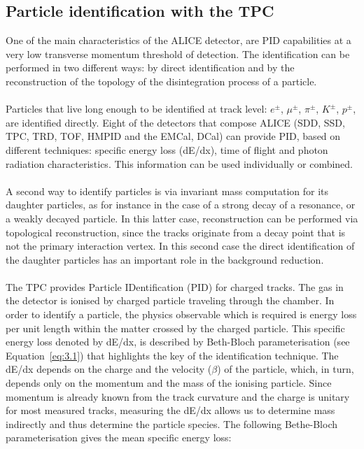 \subsection{Particle identification with the TPC }
\label{par:3.2f}
One of the main characteristics of the ALICE detector, are PID capabilities at a very low transverse momentum threshold of detection. The identification can be performed in two different ways: by direct identification and by the reconstruction of the topology of the disintegration process of a particle.\\
\\
Particles that live long enough to be identified at track level: $e^{\pm}$, $\mu^{\pm}$, $\pi^{\pm}$, $K^{\pm}$, $p^{\pm}$, are identified directly. Eight of the detectors that compose ALICE (SDD, SSD, TPC, TRD, TOF, HMPID and the EMCal, DCal) can provide PID, based on different techniques: specific energy loss (dE/dx), time of flight and photon radiation characteristics. This information can be used individually or combined.\\
\\
A second way to identify particles is via invariant mass computation for its daughter particles, as for instance in the case of a strong decay of a resonance, or a weakly decayed particle. In this latter case, reconstruction can be performed via topological reconstruction, since the tracks originate from a decay point that is not the primary interaction vertex. In this second case the direct identification of the daughter particles has an important role in the background reduction.\\
\\
The TPC provides Particle IDentification (PID) for charged tracks. The gas in the detector is ionised by charged particle traveling through the chamber. In order to identify a particle, the physics observable which is required is energy loss per unit length within the matter crossed by the charged particle. This specific energy loss denoted by dE/dx, is described by Beth-Bloch parameterisation (see \mbox{Equation \ref{eq:3.1}}) that highlights the key of the identification technique. The dE/dx depends on the charge and the velocity ($\beta$) of the particle, which, in turn, depends only on the momentum and the mass of the ionising particle. Since momentum is already known from the track curvature and the charge is unitary for most measured tracks, measuring the dE/dx allows us to determine mass indirectly and thus determine the particle species. The following Bethe-Bloch parameterisation gives the mean specific energy loss:

